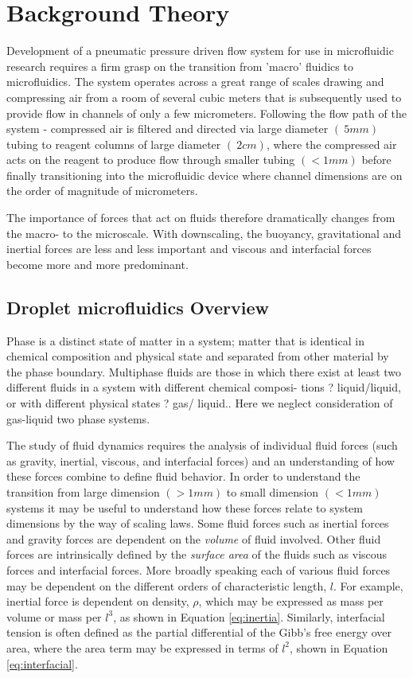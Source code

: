 \chapter{Background Theory}

Development of a pneumatic pressure driven flow system for use in microfluidic research requires a firm grasp on the transition from 'macro' fluidics to microfluidics. The system operates across a great range of scales drawing and compressing air from a room of several cubic meters that is subsequently used to provide flow in channels of only a few micrometers. Following the flow path of the system - compressed air is filtered and directed via large diameter $(~5mm)$ tubing to reagent columns of large diameter $(~2cm)$, where the compressed air acts on the reagent to produce flow through smaller tubing $(<1mm)$ before finally transitioning into the microfluidic device where channel dimensions are on the order of magnitude of micrometers. 


The importance of forces that act on fluids therefore dramatically changes from the macro- to the microscale. With downscaling, the buoyancy, gravitational and inertial forces are less and less important and viscous and interfacial forces become more and more predominant.\cite{Shui2007}


\section{Droplet microfluidics Overview}
Phase is a distinct state of matter in a system; matter that is identical in chemical composition and physical state and separated from other material by the phase boundary. Multiphase fluids are those in which there exist at least two different fluids in a system with different chemical composi- tions ? liquid/liquid, or with different physical states ? gas/ liquid.\cite{Shui2007}. Here we neglect consideration of gas-liquid two phase systems. 


\cite{Yang2010,Shui2007a,Zhao2011}


The study of fluid dynamics requires the analysis of individual fluid forces (such as gravity, inertial, viscous, and interfacial forces) and an understanding of how these forces combine to define fluid behavior. In order to understand the transition from large dimension $(>1mm)$ to small dimension $(<1mm)$ systems it may be useful to understand how these forces relate to system dimensions by the way of scaling laws. Some fluid forces such as inertial forces and gravity forces are dependent on the \emph{volume} of fluid involved. Other fluid forces are intrinsically defined by the \emph{surface area} of the fluids such as viscous forces and interfacial forces. More broadly speaking each of various fluid forces may be dependent on the different orders of characteristic length, $l$. For example, inertial force is dependent on density, $\rho$, which may be expressed as mass per volume or mass per $l^3$, as shown in Equation \vref{eq:inertia}. Similarly, interfacial tension is often defined as the partial differential of the Gibb's free energy over area, where the area term may be expressed in terms of $l^2$, shown in Equation \vref{eq:interfacial}.


